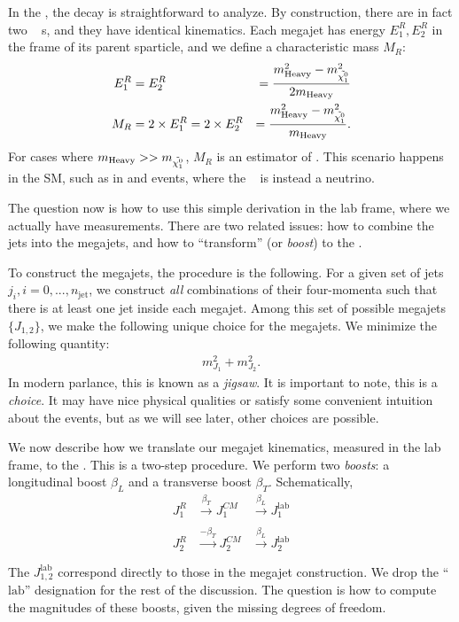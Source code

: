 In the \rframe, the decay is straightforward to analyze.
By construction, there are in fact two \rframe~ s, and they have identical kinematics.
Each megajet has energy $E_1^R, E_2^R$ in the frame of its parent sparticle, and we define a characteristic mass $M_R$:
\begin{align}\label{eq:mr}
E_1^R &= E_2^R &= \frac{m_{\mathrm{Heavy}}^2 - m_{\tilde{\chi^0_1}}^2}{ 2 m_{\mathrm{Heavy}} } \\
M_R &= 2 \times E_1^R = 2 \times E_2^R &= \frac{m_{\mathrm{Heavy}}^2 - m_{\tilde{\chi^0_1}}^2}{m_{\mathrm{Heavy}} }.
\end{align}
For cases where $m_{\mathrm{Heavy}} >> m_{\tilde{\chi^0_1}}$, $M_R$ is an estimator of \mheavy.
This scenario happens in the SM, such as in \ttbar and \WW events, where the \lsp~ is instead a neutrino.

The question now is how to use this simple derivation in the lab frame, where we actually have measurements.
There are two related issues: how to combine the jets into the megajets, and how to ``transform'' (or \textit{boost}) to the \rframe.

To construct the megajets, the procedure is the following.
For a given set of jets $j_i, i = 0 , ... , n_{\mathrm{jet}}$, we construct \textit{all} combinations of their four-momenta such that there is at least one jet inside each megajet.
Among this set of possible megajets $\{J_{1,2}\}$, we make the following unique choice for the megajets.
We minimize the following quantity:
\begin{align}
m_{J_1}^2 + m_{J_2}^2.
\end{align}
In modern parlance, this is known as a \textit{jigsaw}.
It is important to note, this is a \textit{choice}.
It may have nice physical qualities or satisfy some convenient intuition about the events, but as we will see later, other choices are possible.

We now describe how we translate our megajet kinematics, measured in the lab frame, to the \rframe.
This is a two-step procedure.
We perform two \textit{boosts}: a longitudinal boost $\beta_L$ and a transverse boost $\beta_T$.
Schematically,
\begin{align}
J_1^R & \xrightarrow[]{\beta_T } J_1^{CM} & \xrightarrow[]{\beta_L} J_1^{\text{lab}} \\
J_2^R & \xrightarrow[]{-\beta_T} J_2^{CM} & \xrightarrow[]{\beta_L} J_2^{\text{lab}} \\
\end{align}
The $J_{1,2}^{\text{lab}}$ correspond directly to those in the megajet construction.
We drop the ``$\text{lab}$'' designation for the rest of the discussion.
The question is how to compute the magnitudes of these boosts, given the missing degrees of freedom.

